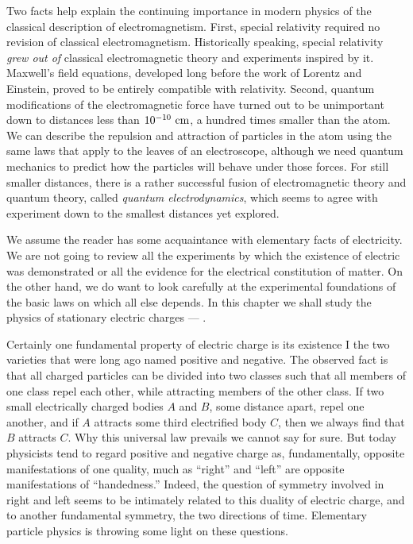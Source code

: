 Two facts help explain the continuing importance in modern
physics of the classical description of electromagnetism. First, special
relativity required no revision of classical electromagnetism. Historically
speaking, special relativity \emph{grew out of} classical electromagnetic
theory and experiments inspired by it. Maxwell's field equations, developed
long before the work of Lorentz and Einstein, proved to be entirely compatible
with relativity. Second, quantum modifications of the electromagnetic force
have turned out to be unimportant down to distances less than $10^{-10}\ \textup{cm}$, a
hundred times smaller than the atom. We can describe the repulsion and
attraction of particles in the atom using the same laws that apply to the
leaves of an electroscope, although we need quantum mechanics to predict how
the particles will behave under those forces. For still smaller distances,
there is a rather successful fusion of electromagnetic theory and quantum
theory, called \emph{quantum electrodynamics}, which seems to agree with
experiment down to the smallest distances yet explored. 

We assume the reader has some acquaintance with elementary
facts of electricity. We are not going to review all the experiments by which
the existence of electric was demonstrated or all the evidence for the
electrical constitution of matter. On the other hand, we do want to look
carefully at the experimental foundations of the basic laws on which all else
depends. In this chapter we shall study the physics of stationary electric
charges --- .

Certainly one fundamental property of electric charge is its
existence I the two varieties that were long ago named positive and negative.
The observed fact is that all charged particles can be divided into two classes
such that all members of one class repel each other, while attracting members
of the other class. If two small electrically charged bodies $A$ and
$B$, some distance apart, repel one another, and if $A$ attracts some
third electrified body $C$, then we always find that $B$ attracts
$C$. Why this universal law prevails we cannot say for sure. But today
physicists tend to regard positive and negative charge as, fundamentally,
opposite manifestations of one quality, much as ``right'' and ``left'' are
opposite manifestations of ``handedness.'' Indeed, the question of symmetry
involved in right and left seems to be intimately related to this duality of
electric charge, and to another fundamental symmetry, the two directions of
time. Elementary particle physics is throwing some light on these questions.

